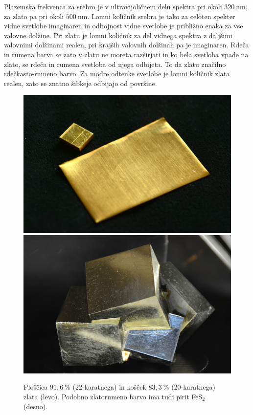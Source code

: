 Plazemska frekvenca za srebro je v ultravijoličnem delu spektra 
pri okoli $320~\si{\nano\meter}$, za zlato pa pri okoli $500~\si{\nano\meter}$.
Lomni količnik srebra je tako za celoten spekter vidne svetlobe imaginaren in odbojnost
vidne svetlobe je približno enaka za vse valovne dolžine. Pri zlatu je lomni 
količnik za del vidnega spektra z daljšimi valovnimi dolžinami realen, pri 
krajših valovnih dolžinah pa je imaginaren. Rdeča in rumena barva se zato v zlatu 
ne moreta razširjati in ko bela svetloba vpade na zlato, se rdeča in rumena svetloba
od njega odbijeta. To da zlatu značilno rdečkasto-rumeno barvo. Za modre odtenke
svetlobe je lomni količnik zlata realen, zato se znatno šibkeje odbijajo od površine.
\begin{figure}[ht]
\centering
\includegraphics[width=7truecm]{slike/09_zlato.jpg}\hfill
\includegraphics[width=7truecm]{slike/09_pirit.jpg}
\caption{Ploščica $91,6~\%$ (22-karatnega) in košček $83,3~\%$ (20-karatnega) zlata (levo). 
Podobno zlatorumeno barvo ima tudi pirit FeS$_2$ (desno).}
\label{fig:09_zlato}
\end{figure}

